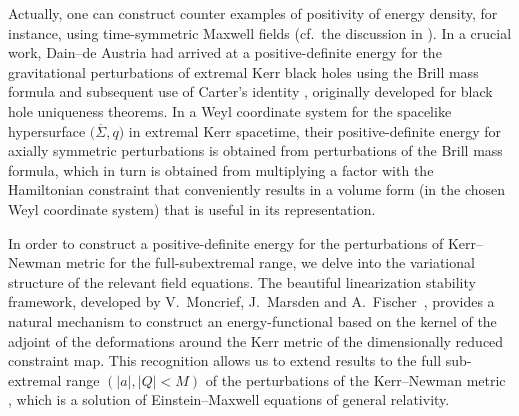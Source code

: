 \documentclass[11pt]{article}
\numberwithin{equation}{section}
\def\olin#1{\overline{#1}{}}%
\numberwithin{equation}{section}
\begin{document}
Actually, one can construct counter examples of positivity of energy density, for instance, using time-symmetric Maxwell fields (cf.\ the discussion in \cite[Section 2]{GM17_gentitle}). In a crucial work, Dain--de Austria \cite{DA_14} had arrived at a positive-definite energy for the gravitational perturbations of extremal Kerr black holes using the Brill mass formula \cite{D09} and subsequent use of Carter's identity \cite{Car_71}, originally developed for black hole uniqueness theorems. In a Weyl coordinate system for the spacelike hypersurface $\bigl(\olin{\Sigma}, q\bigr)$ in extremal Kerr spacetime, their positive-definite energy for axially symmetric perturbations is obtained
from perturbations of the Brill mass formula, which in turn is obtained from multiplying a factor with the Hamiltonian constraint that conveniently results in a volume form (in the chosen Weyl coordinate system) that is useful in its representation.

In order to construct a positive-definite energy for the perturbations of Kerr--Newman metric for the full-subextremal range, we delve into the variational structure of the relevant field equations. The beautiful linearization stability framework, developed by V.~Moncrief, J.~Marsden and A.~Fischer~\cite{FM_75,FMM_80,Mon_75}, provides a
natural mechanism to construct an energy-functional based on the kernel of the adjoint of the deformations around the Kerr metric of the dimensionally reduced constraint map. This recognition allows us to extend results to the full sub-extremal range $(\vert a \vert, \vert Q \vert <M)$ of the perturbations of the Kerr--Newman metric \cite{GM17_gentitle}, which is a solution of Einstein--Maxwell equations of general relativity.
\end{document}
